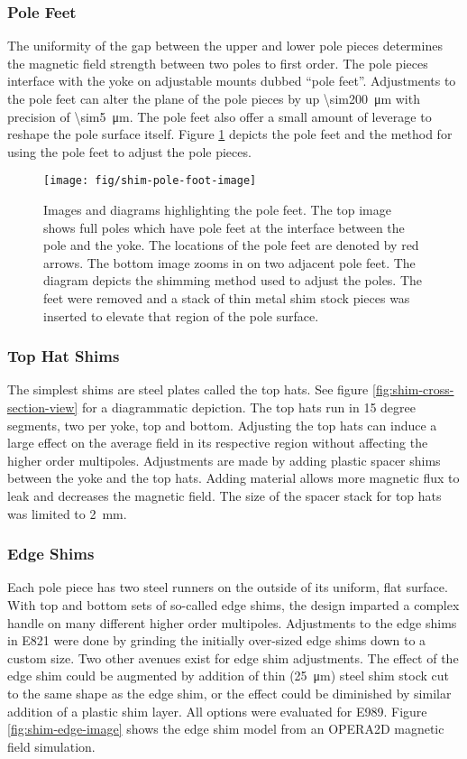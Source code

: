 \subsubsection{Pole Feet}
The uniformity of the gap between the upper and lower pole pieces determines the magnetic field strength between two poles to first order. The pole pieces interface with the yoke on adjustable mounts dubbed ``pole feet''.  Adjustments to the pole feet can alter the plane of the pole pieces by up \SI{\sim200}{\micro \meter} with precision of \SI{\sim5}{\micro \meter}.  The pole feet also offer a small amount of leverage to reshape the pole surface itself.  Figure \ref{fig:shim-pole-foot-image} depicts the pole feet and the method for using the pole feet to adjust the pole pieces.

\begin{figure}
\centering
\texttt{[image: fig/shim-pole-foot-image]}
\caption{
    Images and diagrams highlighting the pole feet.  The top image shows full poles which have pole feet at the interface between the pole and the yoke.  The locations of the pole feet are denoted by red arrows. The bottom image zooms in on two adjacent pole feet.  The diagram depicts the shimming method used to adjust the poles.  The feet were removed and a stack of thin metal shim stock pieces was inserted to elevate that region of the pole surface. 
    \label{fig:shim-pole-foot-image}
}
\end{figure}


\subsubsection{Top Hat Shims}
The simplest shims are steel plates called the top hats.  See figure \ref{fig:shim-cross-section-view} for a diagrammatic depiction.  The top hats run in 15 degree segments, two per yoke, top and bottom.  Adjusting the top hats can induce a large effect on the average field in its respective region without affecting the higher order multipoles.  Adjustments are made by adding plastic spacer shims between the yoke and the top hats.  Adding material allows more magnetic flux to leak and decreases the magnetic field.  The size of the spacer stack for top hats was limited to \SI{2}{\mm}.

\subsubsection{Edge Shims}
Each pole piece has two steel runners on the outside of its uniform, flat surface.  With top and bottom sets of so-called edge shims, the design imparted a complex handle on many different higher order multipoles.  Adjustments to the edge shims in E821 were done by grinding the initially over-sized edge shims down to a custom size.  Two other avenues exist for edge shim adjustments. The effect of the edge shim could be augmented by addition of thin (\SI{25}{\micro \meter}) steel shim stock cut to the same shape as the edge shim, or the effect could be diminished by similar addition of a plastic shim layer.  All options were evaluated for E989.  Figure \ref{fig:shim-edge-image} shows the edge shim model from an OPERA2D magnetic field simulation.  

